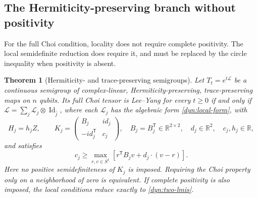 \documentclass[reqno]{amsart}
\newtheorem{theorem}{Theorem}[section]
\theoremstyle{definition}
\theoremstyle{remark}
\newcommand{\R}{\mathbb R}
\DeclareMathOperator{\Id}{Id}
\begin{document}
\subsection{The Hermiticity-preserving branch without positivity}

For the full Choi condition, locality does not require complete positivity.
The local semidefinite reduction does require it, and must be replaced by
the circle inequality when positivity is absent.

\begin{theorem}[Hermiticity- and trace-preserving semigroups]\label{dyn:hp}
Let $T_t=e^{t\mathcal L}$ be a continuous semigroup of complex-linear,
Hermiticity-preserving, trace-preserving maps on $n$ qubits.  Its full
Choi tensor is Lee--Yang for every $t\ge0$ if and only if
$\mathcal L=\sum_j\mathcal L_j\otimes\Id_{\widehat j}$, where each
$\mathcal L_j$ has the algebraic form \eqref{dyn:local-form}, with
\[
 H_j=h_jZ,\qquad
 K_j=\begin{pmatrix}B_j&i d_j\\-i d_j^{\mathsf T}&c_j\end{pmatrix},
 \quad B_j=B_j^{\mathsf T}\in\R^{2\times2},\quad
 d_j\in\R^2,\quad c_j,h_j\in\R,
\]
and satisfies
\begin{equation}\label{dyn:hp-circle}
 c_j\ge\max_{r,v\in S^1}
 [r^{\mathsf T}B_jv+d_j\cdot(v-r)].
\end{equation}
Here no positive semidefiniteness of $K_j$ is imposed.  Requiring the
Choi property only on a neighborhood of zero is equivalent.  If complete
positivity is also imposed, the local conditions reduce exactly to
\eqref{dyn:two-lmis}.
\end{theorem}
\end{document}
